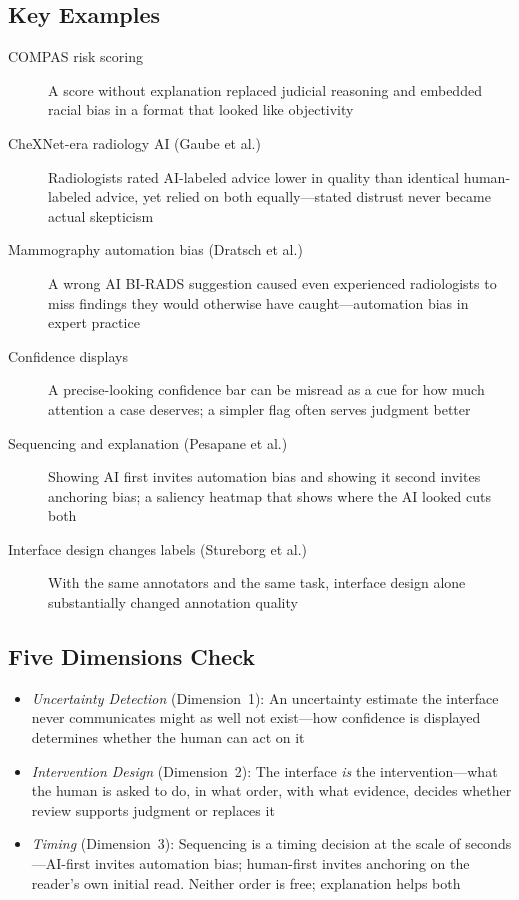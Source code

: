 \subsection*{Key Examples}

\begin{description}
    \item[COMPAS risk scoring] A score without explanation replaced judicial reasoning and embedded racial bias in a format that looked like objectivity
    \item[CheXNet-era radiology AI (Gaube et al.)] Radiologists rated AI-labeled advice lower in quality than identical human-labeled advice, yet relied on both equally---stated distrust never became actual skepticism
    \item[Mammography automation bias (Dratsch et al.)] A wrong AI BI-RADS suggestion caused even experienced radiologists to miss findings they would otherwise have caught---automation bias in expert practice
    \item[Confidence displays] A precise-looking confidence bar can be misread as a cue for how much attention a case deserves; a simpler flag often serves judgment better
    \item[Sequencing and explanation (Pesapane et al.)] Showing AI first invites automation bias and showing it second invites anchoring bias; a saliency heatmap that shows where the AI looked cuts both
    \item[Interface design changes labels (Stureborg et al.)] With the same annotators and the same task, interface design alone substantially changed annotation quality
\end{description}

\subsection*{Five Dimensions Check}

\begin{itemize}
    \item \textit{Uncertainty Detection} (Dimension~1): An uncertainty estimate the interface never communicates might as well not exist---how confidence is displayed determines whether the human can act on it
    \item \textit{Intervention Design} (Dimension~2): The interface \emph{is} the intervention---what the human is asked to do, in what order, with what evidence, decides whether review supports judgment or replaces it
    \item \textit{Timing} (Dimension~3): Sequencing is a timing decision at the scale of seconds---AI-first invites automation bias; human-first invites anchoring on the reader's own initial read. Neither order is free; explanation helps both
\end{itemize}

